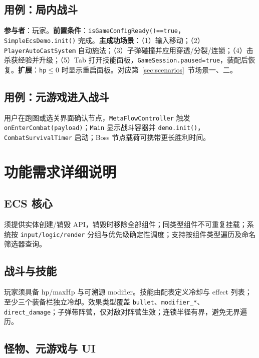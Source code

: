 \subsection{用例：局内战斗}

\textbf{参与者}：玩家。\textbf{前置条件}：\texttt{isGameConfigReady()==true}，\texttt{SimpleEcsDemo.init()} 完成。\textbf{主成功场景}：（1）输入移动；（2）\texttt{PlayerAutoCastSystem} 自动施法；（3）子弹碰撞并应用穿透/分裂/连锁；（4）击杀获经验并升级；（5）Tab 打开技能面板，\texttt{GameSession.paused=true}，装配后恢复。\textbf{扩展}：\texttt{hp}$\leq$0 时显示重启面板。对应第~\ref{sec:scenarios}~节场景一、二。

\subsection{用例：元游戏进入战斗}

用户在跑图或选关界面确认节点，\texttt{MetaFlowController} 触发 \texttt{onEnterCombat(payload)}；\texttt{Main} 显示战斗容器并 \texttt{demo.init()}，\texttt{CombatSurvivalTimer} 启动；Boss 节点载荷可携带更长胜利时间。

\section{功能需求详细说明}
\label{sec:func-detail}

\subsection{ECS 核心}

须提供实体创建/销毁 API，销毁时移除全部组件；同类型组件不可重复挂载；系统按 \texttt{input/logic/render} 分组与优先级确定性调度；支持按组件类型遍历及命名筛选器查询\cite{gregory2018game}。

\subsection{战斗与技能}

玩家须具备 hp/maxHp 与可溯源 modifier。技能由配表定义冷却与 effect 列表；至少三个装备栏独立冷却。效果类型覆盖 \texttt{bullet}、\texttt{modifier\_*}、\texttt{direct\_damage}；子弹带阵营，仅对敌对阵营生效；连锁半径有界，避免无界遍历\cite{helbing2000panic}。

\subsection{怪物、元游戏与 UI}

